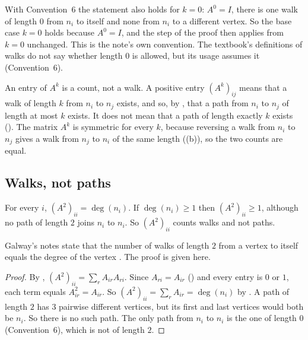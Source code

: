 \begin{remark}\label{rem:zero}
With Convention~6 the statement also holds for $k=0$: $A^0=I$, there is one walk of length $0$ from $n_i$ to itself and none from $n_i$ to a different vertex. So the base case $k=0$ holds because $A^0=I$, and the step of the proof then applies from $k=0$ unchanged. This is the note's own convention. The textbook's definitions of walks do not say whether length $0$ is allowed, but its usage assumes it (Convention~6).
\end{remark}

\begin{remark}\label{rem:entrycount}
An entry of $A^k$ is a count, not a walk. A positive entry $(A^k)_{ij}$ means that a walk of length $k$ from $n_i$ to $n_j$ exists, and so, by , that a path from $n_i$ to $n_j$ of length at most $k$ exists. It does not mean that a path of length exactly $k$ exists (). The matrix $A^k$ is symmetric for every $k$, because reversing a walk from $n_i$ to $n_j$ gives a walk from $n_j$ to $n_i$ of the same length ((b)), so the two counts are equal.
\end{remark}

\subsection{Walks, not paths}


\begin{theorem}\label{prop:notpaths}
For every $i$, $(A^2)_{ii}=\deg(n_i)$. If $\deg(n_i)\ge 1$ then $(A^2)_{ii}\ge 1$, although no path of length $2$ joins $n_i$ to $n_i$. So $(A^2)_{ii}$ counts walks and not paths.
\end{theorem}
Galway's notes state that the number of walks of length $2$ from a vertex to itself equals the degree of the vertex \cite[p.~4]{uogalway_adjacency_notes}. The proof is given here.
\begin{proof}
By , $(A^2)_{ii}=\sum_r A_{ir}A_{ri}$. Since $A_{ri}=A_{ir}$ () and every entry is $0$ or $1$, each term equals $A_{ir}^2=A_{ir}$. So $(A^2)_{ii}=\sum_r A_{ir}=\deg(n_i)$ by . A path of length $2$ has $3$ pairwise different vertices, but its first and last vertices would both be $n_i$. So there is no such path. The only path from $n_i$ to $n_i$ is the one of length $0$ (Convention~6), which is not of length $2$.
\end{proof}

